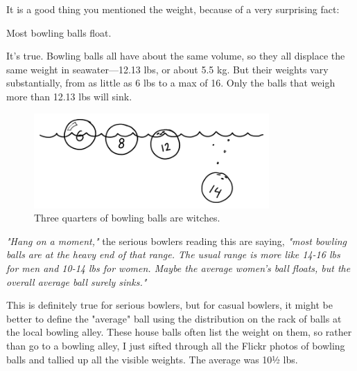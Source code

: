 {\hfill{}

{It is a good thing you mentioned the weight, because of a very surprising fact:}

{Most bowling balls float.}

{It's true. Bowling balls all have about the same volume, so they all displace the same weight in seawater—12.13 lbs, or about 5.5 kg. But their weights vary substantially, from as little as 6 lbs to a max of 16. Only the balls that weigh more than 12.13 lbs will sink.}

\begin{figure}[!htbp]
\centering
\includegraphics[scale=0.5, max width=0.8\textwidth]{imgs/a/125/sink.png}
\caption{Three quarters of bowling balls are witches.}
\end{figure}

{ \emph{"Hang on a moment,"} the serious bowlers reading this are saying, \emph{"most bowling balls are at the heavy end of that range. The usual range is more like 14-16 lbs for men and 10-14 lbs for women. Maybe the average women's ball floats, but the overall average ball surely sinks."} }

{This is definitely true for serious bowlers, but for casual bowlers, it might be better to define the "average" ball using the distribution on the rack of balls at the local bowling alley. These house balls often list the weight on them, so rather than go to a bowling alley, I just sifted through all the Flickr photos of bowling balls and tallied up all the visible weights. The average was 10½ lbs.}

}
